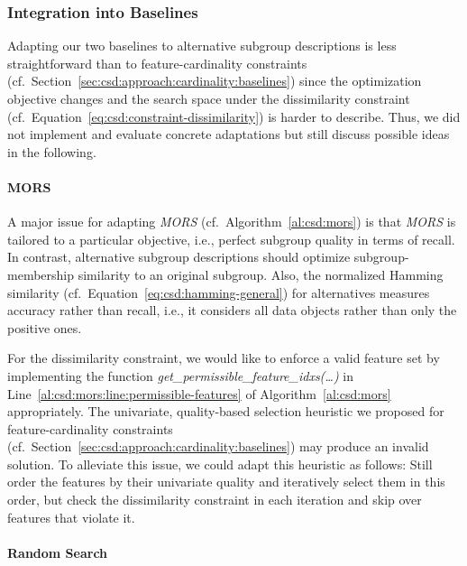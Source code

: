 \documentclass{article}
\theoremstyle{definition}
\begin{document}
\subsubsection{Integration into Baselines}
\label{sec:csd:approach:alternatives:baselines}

Adapting our two baselines to alternative subgroup descriptions is less straightforward than to feature-cardinality constraints (cf.~Section~\ref{sec:csd:approach:cardinality:baselines}) since the optimization objective changes and the search space under the dissimilarity constraint (cf.~Equation~\ref{eq:csd:constraint-dissimilarity}) is harder to describe.
Thus, we did not implement and evaluate concrete adaptations but still discuss possible ideas in the following.

\paragraph{MORS}

A major issue for adapting \emph{MORS} (cf.~Algorithm~\ref{al:csd:mors}) is that \emph{MORS} is tailored to a particular objective, i.e., perfect subgroup quality in terms of recall.
In contrast, alternative subgroup descriptions should optimize subgroup-membership similarity to an original subgroup.
Also, the normalized Hamming similarity (cf.~Equation~\ref{eq:csd:hamming-general}) for alternatives measures accuracy rather than recall, i.e., it considers all data objects rather than only the positive ones.

For the dissimilarity constraint, we would like to enforce a valid feature set by implementing the function \emph{get\_permissible\_feature\_idxs(\dots)} in Line~\ref{al:csd:mors:line:permissible-features} of Algorithm~\ref{al:csd:mors} appropriately.
The univariate, quality-based selection heuristic we proposed for feature-cardinality constraints (cf.~Section~\ref{sec:csd:approach:cardinality:baselines}) may produce an invalid solution.
To alleviate this issue, we could adapt this heuristic as follows:
Still order the features by their univariate quality and iteratively select them in this order, but check the dissimilarity constraint in each iteration and skip over features that violate it.

\paragraph{Random Search}
\end{document}
